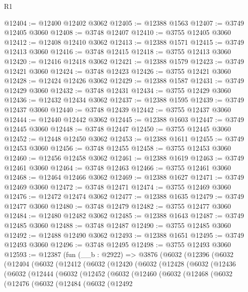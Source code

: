 \begin{lexlean}{R1}
\begin{coremodule}
@12404 := @12400 @12402 @3062
@12405 := @12388 @1563
@12407 := @3749 @12405 @3060
@12408 := @3748 @12407
@12410 := @3755 @12405 @3060
@12412 := @12408 @12410 @3062
@12413 := @12388 @1571
@12415 := @3749 @12413 @3060
@12416 := @3748 @12415
@12418 := @3755 @12413 @3060
@12420 := @12416 @12418 @3062
@12421 := @12388 @1579
@12423 := @3749 @12421 @3060
@12424 := @3748 @12423
@12426 := @3755 @12421 @3060
@12428 := @12424 @12426 @3062
@12429 := @12388 @1587
@12431 := @3749 @12429 @3060
@12432 := @3748 @12431
@12434 := @3755 @12429 @3060
@12436 := @12432 @12434 @3062
@12437 := @12388 @1595
@12439 := @3749 @12437 @3060
@12440 := @3748 @12439
@12442 := @3755 @12437 @3060
@12444 := @12440 @12442 @3062
@12445 := @12388 @1603
@12447 := @3749 @12445 @3060
@12448 := @3748 @12447
@12450 := @3755 @12445 @3060
@12452 := @12448 @12450 @3062
@12453 := @12388 @1611
@12455 := @3749 @12453 @3060
@12456 := @3748 @12455
@12458 := @3755 @12453 @3060
@12460 := @12456 @12458 @3062
@12461 := @12388 @1619
@12463 := @3749 @12461 @3060
@12464 := @3748 @12463
@12466 := @3755 @12461 @3060
@12468 := @12464 @12466 @3062
@12469 := @12388 @1627
@12471 := @3749 @12469 @3060
@12472 := @3748 @12471
@12474 := @3755 @12469 @3060
@12476 := @12472 @12474 @3062
@12477 := @12388 @1635
@12479 := @3749 @12477 @3060
@12480 := @3748 @12479
@12482 := @3755 @12477 @3060
@12484 := @12480 @12482 @3062
@12485 := @12388 @1643
@12487 := @3749 @12485 @3060
@12488 := @3748 @12487
@12490 := @3755 @12485 @3060
@12492 := @12488 @12490 @3062
@12493 := @12388 @1651
@12495 := @3749 @12493 @3060
@12496 := @3748 @12495
@12498 := @3755 @12493 @3060
@12593 := @12387
    (fun (__b : @2922) =>
    @3876
      (@6032
        (@12396
          (@6032
            (@12404
              (@6032
                (@12412
                  (@6032
                    (@12420
                      (@6032
                        (@12428
                          (@6032
                            (@12436
                              (@6032
                                (@12444
                                  (@6032
                                    (@12452
                                      (@6032
                                        (@12460
                                          (@6032
                                            (@12468
                                              (@6032
                                                (@12476
                                                  (@6032
                                                    (@12484
                                                      (@6032
                                                        (@12492

\end{coremodule}
\end{lexlean}
